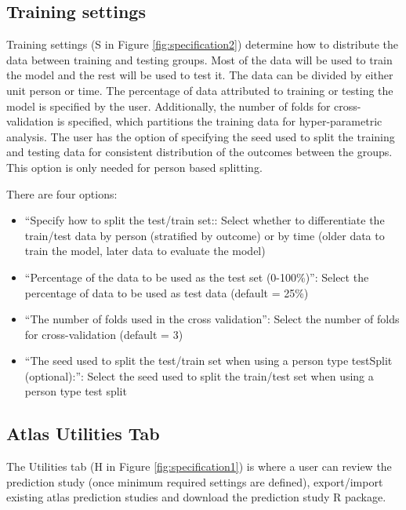 \documentclass[11pt]{book}
\providecommand{\tightlist}{%
  \setlength{\itemsep}{0pt}\setlength{\parskip}{0pt}}
\begin{document}
\subsection{Training settings}\label{training-settings}

Training settings (S in Figure \ref{fig:specification2}) determine how
to distribute the data between training and testing groups. Most of the
data will be used to train the model and the rest will be used to test
it. The data can be divided by either unit person or time. The
percentage of data attributed to training or testing the model is
specified by the user. Additionally, the number of folds for
cross-validation is specified, which partitions the training data for
hyper-parametric analysis. The user has the option of specifying the
seed used to split the training and testing data for consistent
distribution of the outcomes between the groups. This option is only
needed for person based splitting.

There are four options:

\begin{itemize}
\tightlist
\item
  ``Specify how to split the test/train set:: Select whether to
  differentiate the train/test data by person (stratified by outcome) or
  by time (older data to train the model, later data to evaluate the
  model)
\item
  ``Percentage of the data to be used as the test set (0-100\%)'':
  Select the percentage of data to be used as test data (default = 25\%)
\item
  ``The number of folds used in the cross validation'': Select the
  number of folds for cross-validation (default = 3)
\item
  ``The seed used to split the test/train set when using a person type
  testSplit (optional):'': Select the seed used to split the train/test
  set when using a person type test split
\end{itemize}

\subsection{Atlas Utilities Tab}\label{atlas-utilities-tab}

The Utilities tab (H in Figure \ref{fig:specification1}) is where a user
can review the prediction study (once minimum required settings are
defined), export/import existing atlas prediction studies and download
the prediction study R package.
\end{document}

